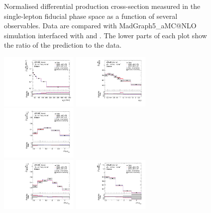 \begin{figure}[ht]
  \caption{Normalised differential \tty production cross-section measured in the single-lepton fiducial phase space as a function of several observables. Data are compared with MadGraph5\_aMC@NLO simulation interfaced with \PYTHIA[8] and \HERWIG[7]. The lower parts of each plot show the ratio of the prediction to the data.}
  \label{fig:tty_prod_diff_Ljets_norm}
\end{figure}
\FloatBarrier

\begin{figure}[ht]
  \centering
  \includegraphics[width=0.33\textwidth]{figures/diff_xsec/normalized-unfolded-distributions/tty_prod_dilep/DL_tty_prod_pt_unfolded_normalized.pdf}%
  \includegraphics[width=0.33\textwidth]{figures/diff_xsec/normalized-unfolded-distributions/tty_prod_dilep/DL_tty_prod_eta_unfolded_normalized.pdf}%
  \includegraphics[width=0.33\textwidth]{figures/diff_xsec/normalized-unfolded-distributions/tty_prod_dilep/DL_tty_prod_drphb_unfolded_normalized.pdf}\\
  \includegraphics[width=0.33\textwidth]{figures/diff_xsec/normalized-unfolded-distributions/tty_prod_dilep/DL_tty_prod_drphl_unfolded_normalized.pdf}%
  \includegraphics[width=0.33\textwidth]{figures/diff_xsec/normalized-unfolded-distributions/tty_prod_dilep/DL_tty_prod_drlj_unfolded_normalized.pdf}%

\end{figure}
